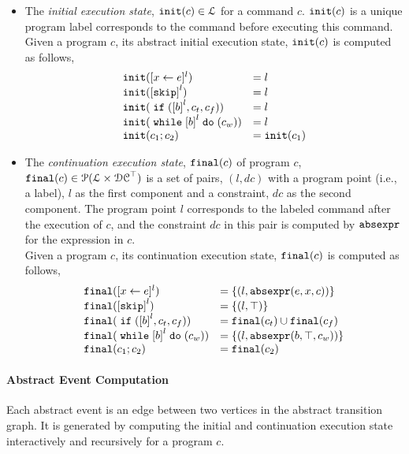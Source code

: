 %
\begin{itemize}
  \item The \emph{initial execution state}, $\mathtt{init}(c) \in \mathcal{L}$
  for a command $c$.
  $\mathtt{init}(c)$ is a unique program label corresponds to the command before executing this command. 
\\
Given a program $c$, its abstract initial execution state, $\mathtt{init}(c)$ is computed as follows,
%
\[
  \begin{array}{ll}
    \absinit(\clabel{\assign{x}{\expr}}{}^l)  & = l  \\
    \absinit(\clabel{\eskip}^{l})  & = l \\
    \absinit(\eif (\clabel{\bexpr}^l, c_t, c_f))  & = l \\
    \absinit(\ewhile \clabel{\bexpr}^l \edo (c_w))  & = l \\
    \absinit(c_1 ; c_2)  & = \absinit(c_1) \\
 \end{array}
 \]
%
%
\item The \emph{continuation execution state}, $\mathtt{final}(c)$ of program $c$, 
$\mathtt{final}(c) \in \mathcal{P}(\mathcal{L} \times \mathcal{DC}^{\top})$
is a set of pairs, $(l, dc)$ with a
program point (i.e., a label), $l$ as the first component and a constraint, 
$dc$ as the second component.
The program point $l$ corresponds to the labeled command after the execution of $c$,
and the constraint $dc$ in this pair is computed by $\mathtt{abs}{\mathtt{expr}}$ for the expression in $c$.
\\
Given a program $c$, its continuation execution state, $\mathtt{final}(c)$ is computed as follows,
 \[
  \begin{array}{ll}
    \absfinal(\clabel{\assign{x}{\expr}}{}^l)  & = \{(l, \absexpr(\expr, x, c))\}  \\
     \absfinal(\clabel{\eskip}^{l})  
     & = \{(l, \top)\} \\
     \absfinal(\eif (\clabel{\bexpr}^l, c_t, c_f))  & = \absfinal(c_t) \cup \absfinal(c_f) \\
     \absfinal(\ewhile \clabel{\bexpr}^l \edo (c_w))  & = \{(l, \absexpr(\bexpr, \top, c_w))\} \\
     \absfinal(c_1 ; c_2)  & =  \absfinal(c_2) \\
 \end{array}
 \]
\end{itemize}
 \paragraph{Abstract Event Computation} Each abstract event is an edge between two vertices in the abstract transition graph.
 It is generated by computing the initial and continuation execution state interactively and recursively for a program $c$.
 
